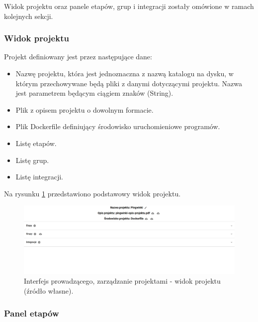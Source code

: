 Widok projektu oraz panele etapów, grup i integracji zostały omówione w ramach kolejnych sekcji.

\subsubsection{Widok projektu}

Projekt definiowany jest przez następujące dane:
\begin {itemize}
    \item Nazwę projektu, która jest jednoznaczna z nazwą katalogu na dysku, w którym przechowywane będą pliki z danymi dotyczącymi projektu.
    Nazwa jest parametrem będącym ciągiem znaków (String).
    \item Plik z opisem projektu o dowolnym formacie.
    \item Plik Dockerfile definiujący środowisko uruchomieniowe programów.
    \item Listę etapów.
    \item Listę grup.
    \item Listę integracji.
\end {itemize}

Na rysunku \ref{fig:lecturer_project_board} przedstawiono podstawowy widok projektu.

\begin{figure}[h]
    \centering
    \includegraphics[width = 13cm]{chapter04/lecturer_project_board.png}
    \caption{Interfejs prowadzącego, zarządzanie projektami - widok projektu (źródło własne).}
    \label{fig:lecturer_project_board}
\end{figure}

\subsubsection{Panel etapów}

